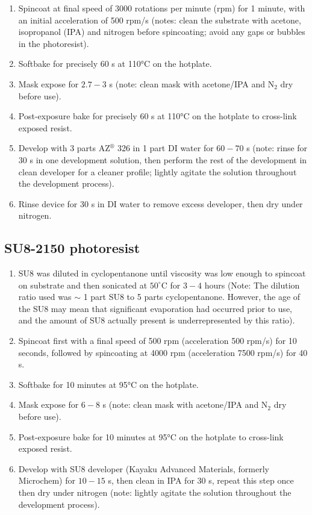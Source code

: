\documentclass[
  a4paper,
]{scrbook}
\begin{document}
\begin{enumerate}
\def\labelenumi{\arabic{enumi}.}
\item
  Spincoat at final speed of 3000 rotations per minute (rpm) for 1
  minute, with an initial acceleration of 500 rpm/s (notes: clean the
  substrate with acetone, isopropanol (IPA) and nitrogen before
  spincoating; avoid any gaps or bubbles in the photoresist).
\item
  Softbake for precisely 60 s at 110°C on the hotplate.
\item
  Mask expose for \(2.7-3\) s (note: clean mask with acetone/IPA and
  N\(_2\) dry before use).
\item
  Post-exposure bake for precisely 60 s at 110°C on the hotplate to
  cross-link exposed resist.
\item
  Develop with 3 parts AZ\(^\circledR\) 326 in 1 part DI water for
  \(60-70\) s (note: rinse for 30 s in one development solution, then
  perform the rest of the development in clean developer for a cleaner
  profile; lightly agitate the solution throughout the development
  process).
\item
  Rinse device for 30 s in DI water to remove excess developer, then dry
  under nitrogen.
\end{enumerate}

\hypertarget{su8-2150-photoresist}{%
\subsection{SU8-2150 photoresist}\label{su8-2150-photoresist}}

\begin{enumerate}
\def\labelenumi{\arabic{enumi}.}
\item
  SU8 was diluted in cyclopentanone until viscosity was low enough to
  spincoat on substrate and then sonicated at \(50^\circ\)C for \(3-4\)
  hours (Note: The dilution ratio used was \(\sim\) 1 part SU8 to 5
  parts cyclopentanone. However, the age of the SU8 may mean that
  significant evaporation had occurred prior to use, and the amount of
  SU8 actually present is underrepresented by this ratio).
\item
  Spincoat first with a final speed of 500 rpm (acceleration 500 rpm/s)
  for 10 seconds, followed by spincoating at 4000 rpm (acceleration 7500
  rpm/s) for 40 s.
\item
  Softbake for 10 minutes at 95°C on the hotplate.
\item
  Mask expose for \(6-8\) s (note: clean mask with acetone/IPA and
  N\(_2\) dry before use).
\item
  Post-exposure bake for 10 minutes at 95°C on the hotplate to
  cross-link exposed resist.
\item
  Develop with SU8 developer (Kayaku Advanced Materials, formerly
  Microchem) for \(10-15\) s, then clean in IPA for 30 s, repeat this
  step once then dry under nitrogen (note: lightly agitate the solution
  throughout the development process).
\end{enumerate}
\end{document}
